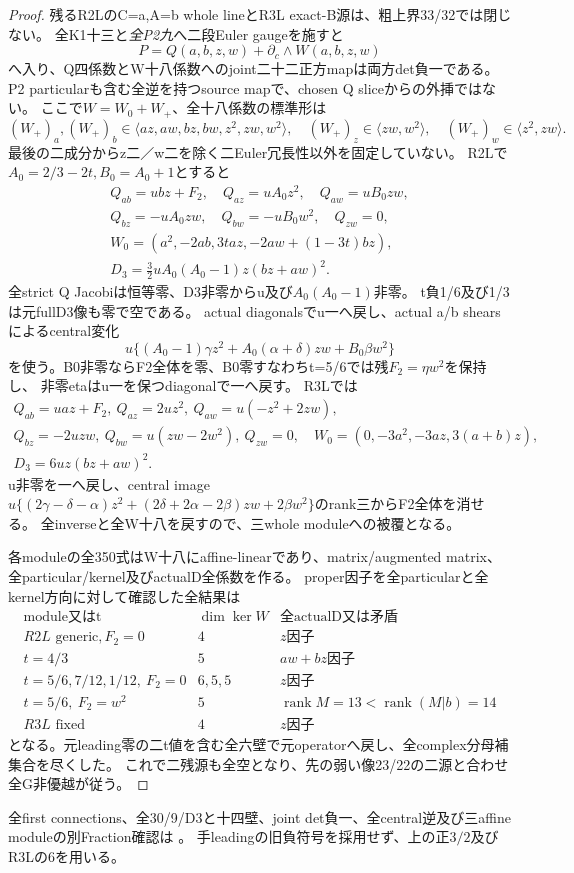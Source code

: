 \documentclass[a4paper,11pt]{ltjsarticle}
\theoremstyle{definition}
\begin{document}
\begin{proof}
残るR2LのC=a,A=b whole lineとR3L exact-B源は、粗上界33/32では閉じない。
全K1十三と\emph{全P2九}へ二段Euler gaugeを施すと
\[
 P=Q(a,b,z,w)+\partial_c\wedge W(a,b,z,w)
\]
へ入り、Q四係数とW十八係数へのjoint二十二正方mapは両方det負一である。
P2 particularも含む全逆を持つsource mapで、chosen Q sliceからの外挿ではない。
ここで$W=W_0+W_+$、全十八係数の標準形は
\[
 (W_+)_a,(W_+)_b\in\langle az,aw,bz,bw,z^2,zw,w^2\rangle,\quad
 (W_+)_z\in\langle zw,w^2\rangle,\quad (W_+)_w\in\langle z^2,zw\rangle.
\]
最後の二成分からz二／w二を除く二Euler冗長性以外を固定していない。
R2Lで$A_0=2/3-2t,B_0=A_0+1$とすると
\[
\begin{gathered}
 Q_{ab}=u bz+F_2,\quad Q_{az}=uA_0z^2,\quad Q_{aw}=uB_0zw,\\
 Q_{bz}=-uA_0zw,\quad Q_{bw}=-uB_0w^2,\quad Q_{zw}=0,\\
 W_0=(a^2,-2ab,3taz,-2aw+(1-3t)bz),\\
 D_3=\tfrac32uA_0(A_0-1)z(bz+aw)^2.
\end{gathered}
\]
全strict Q Jacobiは恒等零、D3非零からu及び$A_0(A_0-1)$非零。
t負1/6及び1/3は元fullD3像も零で空である。
actual diagonalsでu一へ戻し、actual a/b shearsによるcentral変化
\[
 u\{(A_0-1)\gamma z^2+A_0(\alpha+\delta)zw+B_0\beta w^2\}
\]
を使う。B0非零ならF2全体を零、B0零すなわちt=5/6では残$F_2=\eta w^2$を保持し、
非零etaはu一を保つdiagonalで一へ戻す。
R3Lでは
\[
\begin{gathered}
 Q_{ab}=uaz+F_2,\ Q_{az}=2uz^2,\ Q_{aw}=u(-z^2+2zw),\\
 Q_{bz}=-2uzw,\ Q_{bw}=u(zw-2w^2),\ Q_{zw}=0,\quad
 W_0=(0,-3a^2,-3az,3(a+b)z),\\
 D_3=6uz(bz+aw)^2.
\end{gathered}
\]
u非零を一へ戻し、central image
$u\{(2\gamma-\delta-\alpha)z^2+(2\delta+2\alpha-2\beta)zw+2\beta w^2\}$のrank三からF2全体を消せる。
全inverseと全W十八を戻すので、三whole moduleへの被覆となる。

各moduleの全350式はW十八にaffine-linearであり、matrix/augmented matrix、全particular/kernel及びactualD全係数を作る。
proper因子を全particularと全kernel方向に対して確認した全結果は
\[
\begin{array}{c|c|c}
 \text{module又はt}&\dim\ker W&\text{全actualD又は矛盾}\\\hline
 R2L\text{ generic},F_2=0&4&z\text{因子}\\
 t=4/3&5&aw+bz\text{因子}\\
 t=5/6,7/12,1/12,\ F_2=0&6,5,5&z\text{因子}\\
 t=5/6,\ F_2=w^2&5&\operatorname{rank}M=13<\operatorname{rank}(M|b)=14\\
 R3L\text{ fixed}&4&z\text{因子}
\end{array}
\]
となる。元leading零の二t値を含む全六壁で元operatorへ戻し、全complex分母補集合を尽くした。
これで二残源も全空となり、先の弱い像23/22の二源と合わせ全G非優越が従う。
\end{proof}
全first connections、全30/9/D3と十四壁、joint det負一、全central逆及び三affine moduleの別Fraction確認は
。
手leadingの旧負符号を採用せず、上の正$3/2$及びR3Lの6を用いる。
\end{document}
